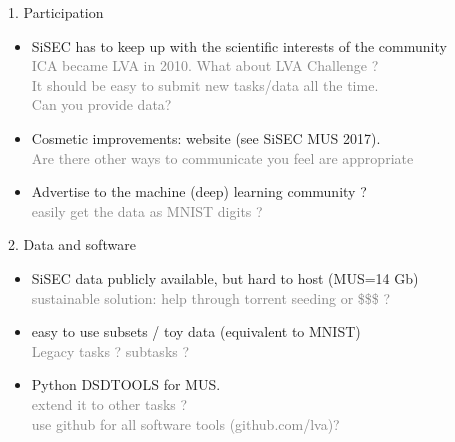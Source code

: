 \documentclass{beamer}
\begin{document}
\begin{frame}{1. Participation}

\begin{itemize}
\item
SiSEC has to keep up with the scientific interests of the community\\
\textcolor{gray}{ICA became LVA in 2010. What about LVA Challenge ?\\
It should be easy to submit new tasks/data all the time.\\Can you provide data?} 
\item
Cosmetic improvements: website (see SiSEC MUS 2017).\\
\textcolor{gray}{Are there other ways to communicate you feel are appropriate}
\item Advertise to the machine (deep) learning community ?\\
\textcolor{gray}{easily get the data as MNIST digits ? }

\end{itemize}

\end{frame}

\begin{frame}[fragile]{2. Data and software}

\begin{itemize}
\item SiSEC data publicly available, but hard to host (MUS=14 Gb)\\
\textcolor{gray}{sustainable solution: help through torrent seeding or \$\$\$ ?}
\item easy to use subsets / toy data (equivalent to MNIST)\\
\textcolor{gray}{Legacy tasks ? subtasks ?}
\item Python DSDTOOLS for MUS. \\ \textcolor{gray}{extend it to other tasks ?}
\\ \textcolor{gray}{use github for all software tools (github.com/lva)?}
\end{itemize}
\end{frame}


\end{document}

